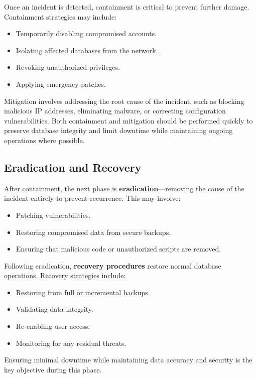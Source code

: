 \documentclass[12pt,a4paper]{article}
\begin{document}
Once an incident is detected, containment is critical to prevent further damage. Containment strategies may include:

\begin{itemize}
  \item Temporarily disabling compromised accounts.
  \item Isolating affected databases from the network.
  \item Revoking unauthorized privileges.
  \item Applying emergency patches.
\end{itemize}

Mitigation involves addressing the root cause of the incident, such as blocking malicious IP addresses, eliminating malware, or correcting configuration vulnerabilities. Both containment and mitigation should be performed quickly to preserve database integrity and limit downtime while maintaining ongoing operations where possible.

\subsection{Eradication and Recovery}

After containment, the next phase is \textbf{eradication}---removing the cause of the incident entirely to prevent recurrence. This may involve:

\begin{itemize}
  \item Patching vulnerabilities.
  \item Restoring compromised data from secure backups.
  \item Ensuring that malicious code or unauthorized scripts are removed.
\end{itemize}

Following eradication, \textbf{recovery procedures} restore normal database operations. Recovery strategies include:

\begin{itemize}
  \item Restoring from full or incremental backups.
  \item Validating data integrity.
  \item Re-enabling user access.
  \item Monitoring for any residual threats.
\end{itemize}

Ensuring minimal downtime while maintaining data accuracy and security is the key objective during this phase.
\end{document}
